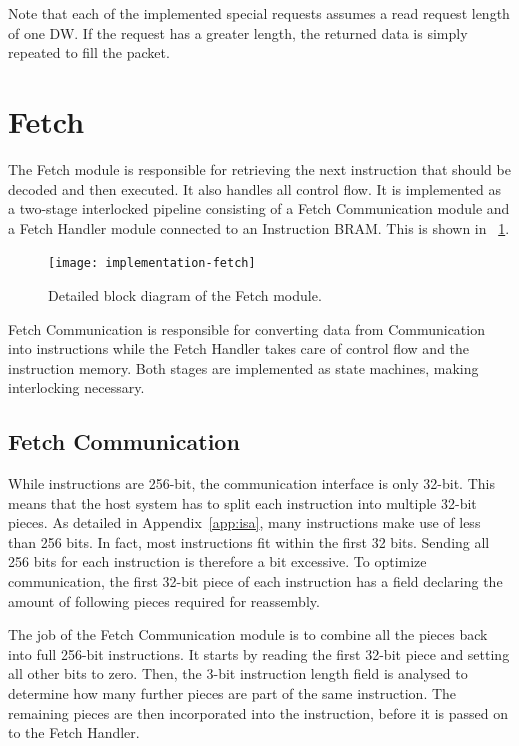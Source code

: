 Note that each of the implemented special requests assumes a read request length of one DW.
If the request has a greater length, the returned data is simply repeated to fill the packet.


\section{Fetch}

The Fetch module is responsible for retrieving the next instruction that should be decoded and then executed.
It also handles all control flow.
It is implemented as a two-stage interlocked pipeline consisting of a Fetch Communication module and a Fetch Handler module connected to an Instruction BRAM.
This is shown in \figurename~\ref{fig:implementation-fetch}.

\begin{figure}[!ht]
    \centering
    \texttt{[image: implementation-fetch]}
    \caption[Fetch module]{Detailed block diagram of the Fetch module.}
    \label{fig:implementation-fetch}
\end{figure}

Fetch Communication is responsible for converting data from Communication into instructions while the Fetch Handler takes care of control flow and the instruction memory.
Both stages are implemented as state machines, making interlocking necessary.

\subsection{Fetch Communication}

While instructions are 256-bit, the communication interface is only 32-bit.
This means that the host system has to split each instruction into multiple 32-bit pieces.
As detailed in Appendix~\ref{app:isa}, many instructions make use of less than 256 bits.
In fact, most instructions fit within the first 32 bits.
Sending all 256 bits for each instruction is therefore a bit excessive.
To optimize communication, the first 32-bit piece of each instruction has a field declaring the amount of following pieces required for reassembly.

The job of the Fetch Communication module is to combine all the pieces back into full 256-bit instructions.
It starts by reading the first 32-bit piece and setting all other bits to zero.
Then, the 3-bit instruction length field is analysed to determine how many further pieces are part of the same instruction.
The remaining pieces are then incorporated into the instruction, before it is passed on to the Fetch Handler.

